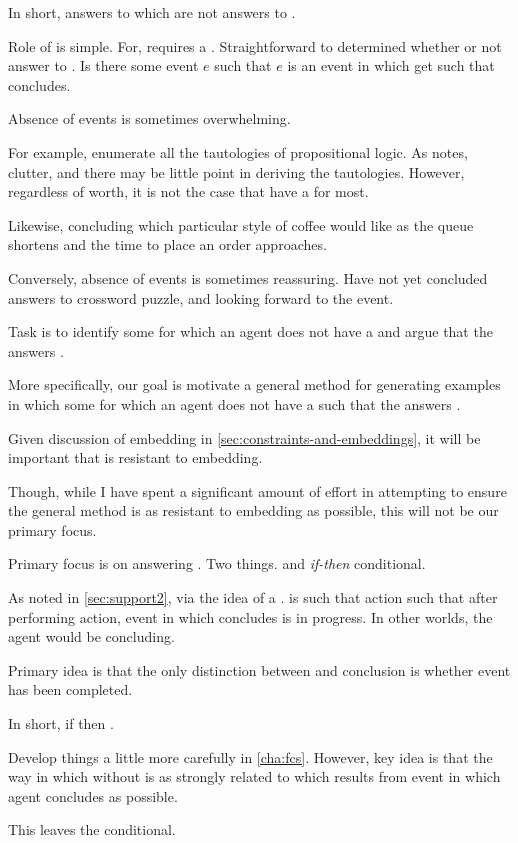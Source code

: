 \begin{note}
  In short, answers to \qWhyV{} which are not answers to \qHowV{}.

  Role of \qHowV{} is simple.
  For, \qHowV{} requires a \witness{}.
  Straightforward to determined whether or not answer to \qHowV{}.
  Is there some event \(e\) such that \(e\) is an event in which get \ros{} such that concludes.

  Absence of events is sometimes overwhelming.

  For example, enumerate all the tautologies of propositional logic.
  As \citeauthor{Harman:1973ww} notes, clutter, and there may be little point in deriving the tautologies.
  However, regardless of worth, it is not the case that have a \witness{} for most.

  Likewise, concluding which particular style of coffee would like as the queue shortens and the time to place an order approaches.

  Conversely, absence of events is sometimes reassuring.
  Have not yet concluded answers to crossword puzzle, and looking forward to the event.

  Task is to identify some \ros{} for which an agent does not have a \witness{} and argue that the \ros{} answers \qWhyVnP{}.

  More specifically, our goal is motivate a general method for generating examples in which some \ros{} for which an agent does not have a \witness{} such that the \ros{} answers \qWhyVnP{}.
\end{note}

\begin{note}
  Given discussion of embedding in \autoref{sec:constraints-and-embeddings}, it will be important that \ros{} is resistant to embedding.

  Though, while I have spent a significant amount of effort in attempting to ensure the general method is as resistant to embedding as possible, this will not be our primary focus.

  Primary focus is on answering \qWhyVnP{}.
  Two things.
  \ros{} and \emph{if-then} conditional.

  As noted in \autoref{sec:support2}, \ros{} via the idea of a \fc{}.
  \fc{} is such that action such that after performing action, event in which concludes is in progress.
  In other worlds, the agent would be concluding.

  Primary idea is that the only distinction between \fc{} and conclusion is whether event has been completed.

  In short, if \fc{} then \ros{}.

  Develop things a little more carefully in \autoref{cha:fcs}.
  However, key idea is that the way in which \ros{} without \witness{} is as strongly related to \ros{} which results from event in which agent concludes as possible.

  This leaves the conditional.
\end{note}


